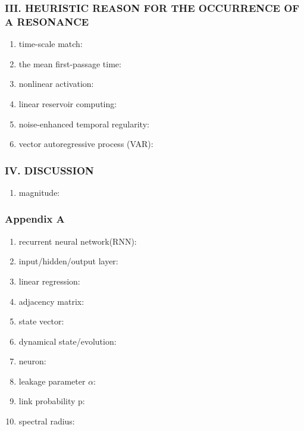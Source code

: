 \subsubsection{III. HEURISTIC REASON FOR THE OCCURRENCE
OF A RESONANCE}
\begin{enumerate}
  \item time-scale match:
  \item the mean first-passage time:
  \item nonlinear activation: 
  \item linear reservoir computing:
  \item noise-enhanced temporal regularity:
  \item vector autoregressive process (VAR): 
\end{enumerate}

\subsubsection{IV. DISCUSSION}
\begin{enumerate}
  \item magnitude: 
\end{enumerate}

\subsubsection{Appendix A}
\begin{enumerate}
  \item recurrent neural network(RNN):
  \item input/hidden/output layer: 
  \item linear regression: 
  \item adjacency matrix:
  \item state vector: 
  \item dynamical state/evolution: 
  \item neuron:
  \item leakage parameter $\alpha$:
  \item link probability p: 
  \item spectral radius:
\end{enumerate}

\clearpage